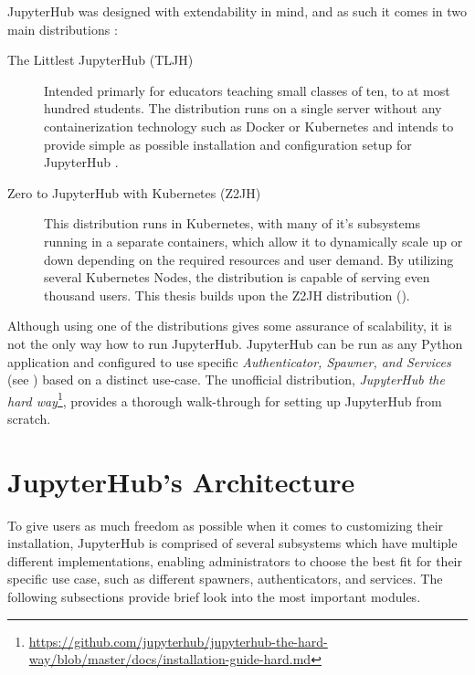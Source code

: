 \documentclass[
  digital,     %
  oneside,     %
  nosansbold,  %
  nocolorbold, %
  lof,         %
  lot,         %
]{fithesis4}
\begin{document}
JupyterHub was designed with extendability in mind, and as such it comes in two main distributions \cite{jupyterhub}:

\begin{description}

    \item[The Littlest JupyterHub (TLJH)]
    Intended primarly for educators teaching small classes of ten, to at most hundred students. The distribution runs on a single server without any containerization technology such as Docker or Kubernetes and intends to provide simple as possible installation and configuration setup for JupyterHub \cite{littlest_jupyterhub}.

    \item[Zero to JupyterHub with Kubernetes (Z2JH)]
    This distribution runs in Kubernetes, with many of it's subsystems running in a separate containers, which allow it to dynamically scale up or down depending on the required resources and user demand. By utilizing several Kubernetes Nodes, the distribution is capable of serving even thousand users. This thesis builds upon the Z2JH distribution ().
    
\end{description}

Although using one of the distributions gives some assurance of scalability, it is not the only way how to run JupyterHub. JupyterHub can be run as any Python application and configured to use specific \emph{Authenticator, Spawner, and Services} (see ) based on a distinct use-case. The unofficial distribution, \emph{JupyterHub the hard way}\footnote{\url{https://github.com/jupyterhub/jupyterhub-the-hard-way/blob/master/docs/installation-guide-hard.md}}, provides a thorough walk-through for setting up JupyterHub from scratch.


\section{JupyterHub's Architecture}
\label{subsec:jupyterhub:architecture}
To give users as much freedom as possible when it comes to customizing their installation, JupyterHub is comprised of several subsystems which have multiple different implementations, enabling administrators to choose the best fit for their specific use case, such as different spawners, authenticators, and services. The following subsections provide brief look into the most important modules.
\end{document}

